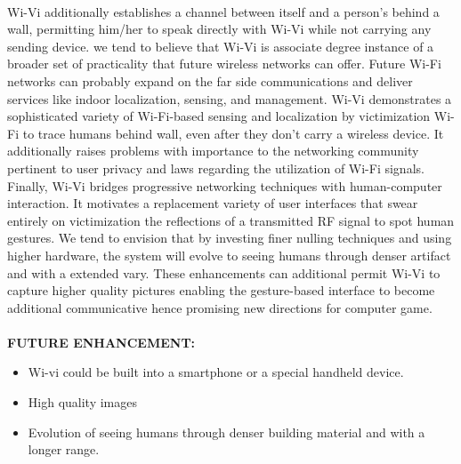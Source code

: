 \documentclass[a4paper,12pt,oneside]{article}
\begin{document}
\paragraph{}
Wi-Vi additionally establishes a channel between itself and a person's behind a wall,
permitting him/her to speak directly with Wi-Vi while not carrying any sending device. we tend
to believe that Wi-Vi is associate degree instance of a broader set of practicality that future
wireless networks can offer. Future Wi-Fi networks can probably expand on the far side
communications and deliver services like indoor localization, sensing, and management. Wi-Vi
demonstrates a sophisticated variety of Wi-Fi-based sensing and localization by victimization
Wi-Fi to trace humans behind wall, even after they don't carry a wireless device. It additionally
raises problems with importance to the networking community pertinent to user privacy and laws
regarding the utilization of Wi-Fi signals. Finally, Wi-Vi bridges progressive networking
techniques with human-computer interaction. It motivates a replacement variety of user
interfaces that swear entirely on victimization the reflections of a transmitted RF signal to spot
human gestures. We tend to envision that by investing finer nulling techniques and using higher
hardware, the system will evolve to seeing humans through denser artifact and with a extended
vary. These enhancements can additional permit Wi-Vi to capture higher quality pictures
enabling the gesture-based interface to become additional communicative hence promising new
directions for computer game.

\paragraph{}
\textbf{FUTURE ENHANCEMENT:}
\begin{itemize}
	\item Wi-vi could be built into a smartphone or a special handheld device.
	\item High quality images
	\item Evolution of seeing humans through denser building material and with a longer range.
\end{itemize}

\newpage
\patchcmd{\thebibliography}
{\section*{\refname}}{}{}{}
\cleardoublepage
\end{document}

